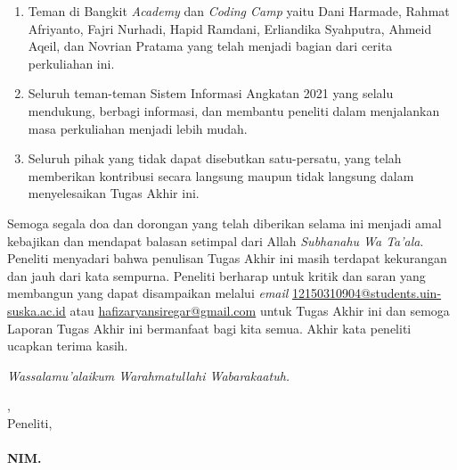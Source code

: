 \begin{enumerate}
	\item Teman di Bangkit \textit{Academy} dan \textit{Coding Camp} yaitu Dani Harmade, Rahmat Afriyanto, Fajri Nurhadi, Hapid Ramdani, Erliandika Syahputra, Ahmeid Aqeil, dan Novrian Pratama yang telah menjadi bagian dari cerita perkuliahan ini.
	\item Seluruh teman-teman Sistem Informasi Angkatan 2021 yang selalu mendukung, berbagi informasi, dan membantu peneliti dalam menjalankan masa perkuliahan menjadi lebih mudah.
	\item Seluruh pihak yang tidak dapat disebutkan satu-persatu, yang telah memberikan kontribusi secara langsung maupun tidak langsung dalam menyelesaikan Tugas Akhir ini.
\end{enumerate}

Semoga segala doa dan dorongan yang telah diberikan selama ini menjadi amal kebajikan dan mendapat balasan setimpal dari Allah \textit{Subhanahu Wa Ta’ala}. Peneliti menyadari bahwa penulisan Tugas Akhir ini masih terdapat kekurangan dan jauh dari kata sempurna. Peneliti berharap untuk kritik dan saran yang membangun yang dapat disampaikan melalui \textit{email} \href{mailto:12150310904@students.uin-suska.ac.id}{12150310904@students.uin-suska.ac.id} atau \href{mailto:hafizaryansiregar@gmail.com}{hafizaryansiregar@gmail.com} untuk Tugas Akhir ini dan semoga Laporan Tugas Akhir ini bermanfaat bagi kita semua. Akhir kata peneliti ucapkan terima kasih.

\textit{Wassalamu’alaikum Warahmatullahi Wabarakaatuh.}

\vspace*{0.1cm}



\begin{flushright}
	\kota, \tanggalPersetujuan\\
	Peneliti,\\
	\vspace{2cm}
	\textbf{\underline{\penulis}\\
		\vspace{-0.15cm}
		NIM. \nim}

\end{flushright}

